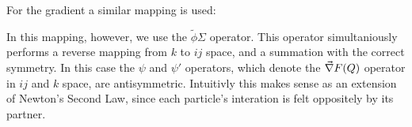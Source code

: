 For the gradient a similar mapping is used:
\begin{figure}[h!]
\begin{center}
\end{center}
\end{figure}

In this mapping, however, we use the $\tilde{\phi}\Sigma$ operator.  This operator simultaniously performs a reverse mapping from $k$ to $ij$ space, and a summation with the correct symmetry.  In this case the $\psi$ and $\psi'$ operators, which denote the $\vec{\nabla} F(Q)$ operator in $ij$ and $k$ space, are antisymmetric.  Intuitivly this makes sense as an extension of Newton's Second Law, since each particle's interation is felt oppositely by its partner.
